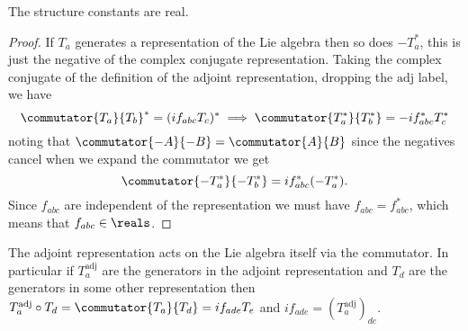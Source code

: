 \documentclass[fleqn]{NotesClass}
\begin{document}
    \begin{crl}{}{}
        The structure constants are real.
        \begin{proof}
            If \(T_a\) generates a representation of the Lie algebra then so does \(-T_a^*\), this is just the negative of the complex conjugate representation.
            Taking the complex conjugate of the definition of the adjoint representation, dropping the \(\mathrm{adj}\) label, we have
            \begin{equation}
                \commutator{T_a}{T_b}^* = (if_{abc}T_c)^* \implies \commutator{T_a^*}{T_b^*} = -if_{abc}^*T_c^*
            \end{equation}
            noting that \(\commutator{-A}{-B} = \commutator{A}{B}\) since the negatives cancel when we expand the commutator we get
            \begin{equation}
                \commutator{-T_a^*}{-T_b^*} = if_{abc}^*(-T_a^*).
            \end{equation}
            Since \(f_{abc}\) are independent of the representation we must have \(f_{abc} = f_{abc}^*\), which means that \(f_{abc} \in \reals\).
        \end{proof}
    \end{crl}
    The adjoint representation acts on the Lie algebra itself via the commutator.
    In particular if \(T_a^{\mathrm{adj}}\) are the generators in the adjoint representation and \(T_d\) are the generators in some other representation then \(T_a^{\mathrm{adj}} \circ T_d = \commutator{T_a}{T_d} = if_{ade}T_e\) and \(if_{ade} = (T_a^{\mathrm{adj}})_{de}\).
    
\end{document}
